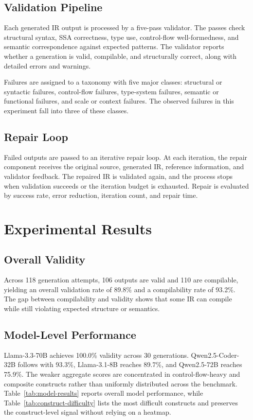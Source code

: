 \documentclass[conference]{IEEEtran}
\begin{document}
\subsection{Validation Pipeline}
Each generated IR output is processed by a five-pass validator. The passes check structural syntax, SSA correctness, type use, control-flow well-formedness, and semantic correspondence against expected patterns. The validator reports whether a generation is valid, compilable, and structurally correct, along with detailed errors and warnings.

Failures are assigned to a taxonomy with five major classes: structural or syntactic failures, control-flow failures, type-system failures, semantic or functional failures, and scale or context failures. The observed failures in this experiment fall into three of these classes.

\subsection{Repair Loop}
Failed outputs are passed to an iterative repair loop. At each iteration, the repair component receives the original source, generated IR, reference information, and validator feedback. The repaired IR is validated again, and the process stops when validation succeeds or the iteration budget is exhausted. Repair is evaluated by success rate, error reduction, iteration count, and repair time.

\section{Experimental Results}
\subsection{Overall Validity}
Across 118 generation attempts, 106 outputs are valid and 110 are compilable, yielding an overall validation rate of 89.8\% and a compilability rate of 93.2\%. The gap between compilability and validity shows that some IR can compile while still violating expected structure or semantics.

\subsection{Model-Level Performance}
Llama-3.3-70B achieves 100.0\% validity across 30 generations. Qwen2.5-Coder-32B follows with 93.3\%, Llama-3.1-8B reaches 89.7\%, and Qwen2.5-72B reaches 75.9\%. The weaker aggregate scores are concentrated in control-flow-heavy and composite constructs rather than uniformly distributed across the benchmark. Table~\ref{tab:model-results} reports overall model performance, while Table~\ref{tab:construct-difficulty} lists the most difficult constructs and preserves the construct-level signal without relying on a heatmap.
\end{document}

